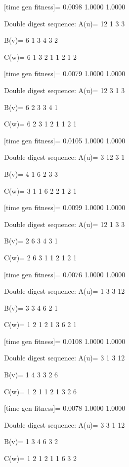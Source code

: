 [time gen fitness]=
    0.0098    1.0000    1.0000

Double digest sequence:
A(u)=
    12     1     3     3

B(v)=
     6     1     3     4     3     2

C(w)=
     6     1     3     2     1     1     2     1     2

[time gen fitness]=
    0.0079    1.0000    1.0000

Double digest sequence:
A(u)=
    12     3     1     3

B(v)=
     6     2     3     3     4     1

C(w)=
     6     2     3     1     2     1     1     2     1

[time gen fitness]=
    0.0105    1.0000    1.0000

Double digest sequence:
A(u)=
     3    12     3     1

B(v)=
     4     1     6     2     3     3

C(w)=
     3     1     1     6     2     2     1     2     1

[time gen fitness]=
    0.0099    1.0000    1.0000

Double digest sequence:
A(u)=
    12     1     3     3

B(v)=
     2     6     3     4     3     1

C(w)=
     2     6     3     1     1     2     1     2     1

[time gen fitness]=
    0.0076    1.0000    1.0000

Double digest sequence:
A(u)=
     1     3     3    12

B(v)=
     3     3     4     6     2     1

C(w)=
     1     2     1     2     1     3     6     2     1

[time gen fitness]=
    0.0108    1.0000    1.0000

Double digest sequence:
A(u)=
     3     1     3    12

B(v)=
     1     4     3     3     2     6

C(w)=
     1     2     1     1     2     1     3     2     6

[time gen fitness]=
    0.0078    1.0000    1.0000

Double digest sequence:
A(u)=
     3     3     1    12

B(v)=
     1     3     4     6     3     2

C(w)=
     1     2     1     2     1     1     6     3     2

